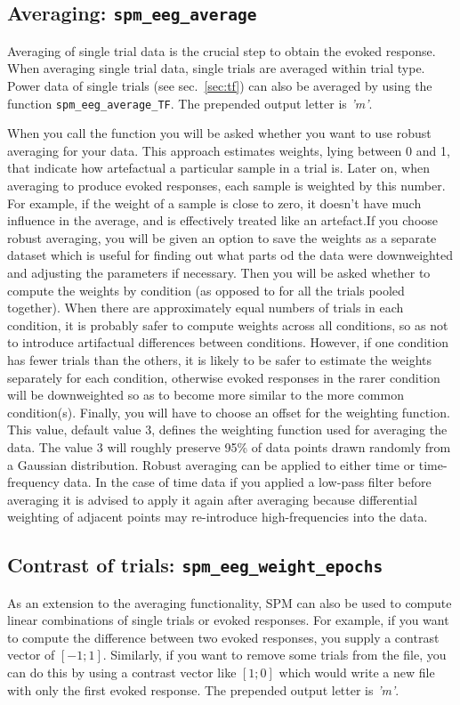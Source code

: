 \subsection{Averaging: \texttt{spm\_eeg\_average}}
Averaging of single trial data is the crucial step to obtain the evoked response. When averaging single trial data, single trials are averaged within trial type. Power data of single trials (see sec.~\ref{sec:tf}) can also be averaged by using the function \texttt{spm\_eeg\_average\_TF}. The prepended output letter is \textit{'m'}.

When you call the function you will be asked whether you want to use robust averaging for your data. This approach estimates weights, lying between 0 and 1, that indicate how artefactual a particular sample in a trial is. Later on, when averaging to produce evoked responses, each sample is weighted by this number. For example, if the weight of a sample is close to zero, it doesn't have much influence in the average, and is effectively treated like an artefact.If you choose robust averaging, you will be given an option to save the weights as a separate dataset which is useful for finding out what parts od the data were downweighted and adjusting the parameters if necessary. Then you will be asked whether to compute the weights by condition (as opposed to for all the trials pooled together). When there are approximately equal numbers of trials in each condition, it is probably safer to compute weights across all conditions, so as not to introduce artifactual differences between conditions. However, if one condition has fewer trials than the others, it is likely to be safer to estimate the weights separately for each condition, otherwise evoked responses in the rarer condition will be downweighted so as to become more similar to the more common condition(s). Finally, you will have to choose an offset for the weighting function. This value, default value 3, defines the weighting function used for averaging the data. The value 3 will roughly preserve 95\% of data points drawn randomly from a Gaussian distribution. Robust averaging can be applied to either time or time-frequency data. In the case of time data if you applied a low-pass filter before averaging it is advised to apply it again after averaging because differential weighting of adjacent points may re-introduce high-frequencies into the data. 

\subsection{Contrast of trials: \texttt{spm\_eeg\_weight\_epochs}}
As an extension to the averaging functionality, SPM can also be used to compute linear combinations of single trials or evoked responses. For example, if you want to compute the difference between two evoked responses, you supply a contrast vector of $[-1; 1]$. Similarly, if you want to remove some trials from the file, you can do this by using a contrast vector like $[1; 0]$ which would write a new file with only the first evoked response. The prepended output letter is \textit{'m'}.

